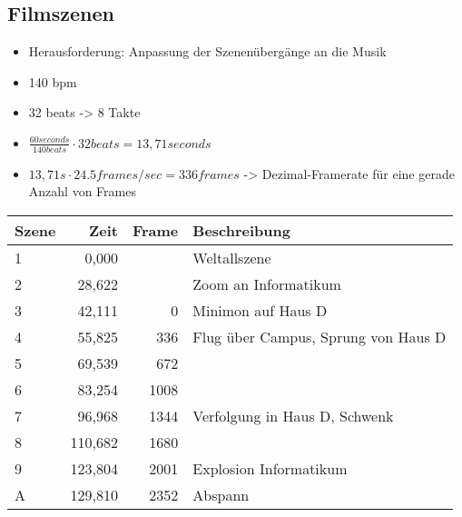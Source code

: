 \subsection{Filmszenen}

\begin{itemize}
	\item Herausforderung: Anpassung der Szenenübergänge an die Musik
	\item 140 bpm
	\item 32 beats -> 8 Takte
	\item $\frac{60 seconds}{140 beats} \cdot 32 beats = 13,71 seconds$
	\item $13,71 s \cdot 24.5 frames/sec = 336 frames$ -> Dezimal-Framerate für eine gerade Anzahl von Frames
\end{itemize}

\begin{tabular}{p{1cm}rrp{9cm}}
	\textbf{Szene} & \textbf{Zeit} & \textbf{Frame} & \textbf{Beschreibung} \\
	\hline
	1 & 0,000 & & Weltallszene\\
	2 & 28,622 & & Zoom an Informatikum\\
	3 & 42,111 & 0 & Minimon auf Haus D\\
	4 & 55,825 & 336 & Flug über Campus, Sprung von Haus D\\
	5 & 69,539 & 672 & \\
	6 & 83,254 & 1008 & \\
	7 & 96,968 & 1344 & Verfolgung in Haus D, Schwenk\\
	8 & 110,682 & 1680 & \\
	9 & 123,804 & 2001 & Explosion Informatikum\\
	A & 129,810 & 2352 & Abspann\\
\end{tabular}